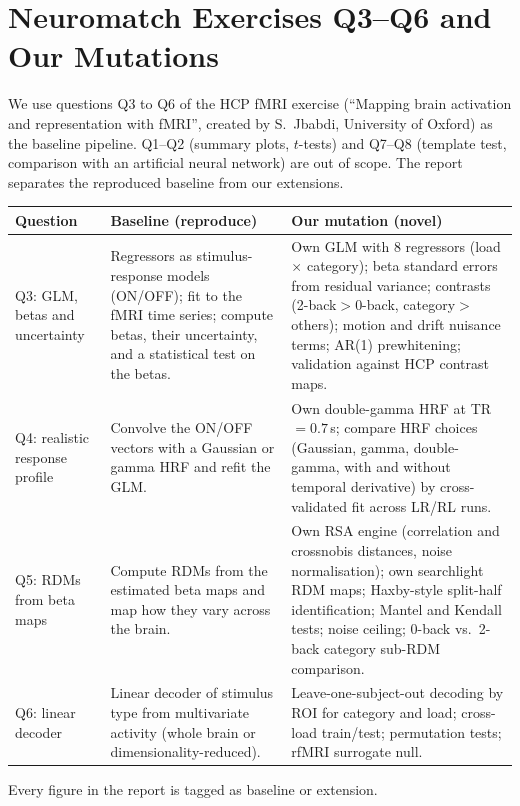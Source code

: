 \documentclass[11pt,a4paper]{article}
\begin{document}

\section{Neuromatch Exercises Q3--Q6 and Our Mutations}
\label{sec:mut}

We use questions Q3 to Q6 of the HCP fMRI exercise (``Mapping brain activation and representation with fMRI'', created by S.\ Jbabdi, University of Oxford) as the baseline pipeline. Q1--Q2 (summary plots, $t$-tests) and Q7--Q8 (template test, comparison with an artificial neural network) are out of scope. The report separates the reproduced baseline from our extensions.

\begin{xltabular}{\linewidth}{@{}p{1.5cm}YY@{}}
\toprule
\textbf{Question} & \textbf{Baseline (reproduce)} & \textbf{Our mutation (novel)}\\
\midrule
\endhead
Q3: GLM, betas and uncertainty & Regressors as stimulus-response models (ON/OFF); fit to the fMRI time series; compute betas, their uncertainty, and a statistical test on the betas. & Own GLM with 8 regressors (load $\times$ category); beta standard errors from residual variance; contrasts (2-back$>$0-back, category$>$others); motion and drift nuisance terms; AR(1) prewhitening; validation against HCP contrast maps.\\
Q4: realistic response profile & Convolve the ON/OFF vectors with a Gaussian or gamma HRF and refit the GLM. & Own double-gamma HRF at TR $=0.7$\,s; compare HRF choices (Gaussian, gamma, double-gamma, with and without temporal derivative) by cross-validated fit across LR/RL runs.\\
Q5: RDMs from beta maps & Compute RDMs from the estimated beta maps and map how they vary across the brain. & Own RSA engine (correlation and crossnobis distances, noise normalisation); own searchlight RDM maps; Haxby-style split-half identification; Mantel and Kendall tests; noise ceiling; 0-back vs.\ 2-back category sub-RDM comparison.\\
Q6: linear decoder & Linear decoder of stimulus type from multivariate activity (whole brain or dimensionality-reduced). & Leave-one-subject-out decoding by ROI for category and load; cross-load train/test; permutation tests; rfMRI surrogate null.\\
\bottomrule
\end{xltabular}

Every figure in the report is tagged as baseline or extension.
\end{document}
